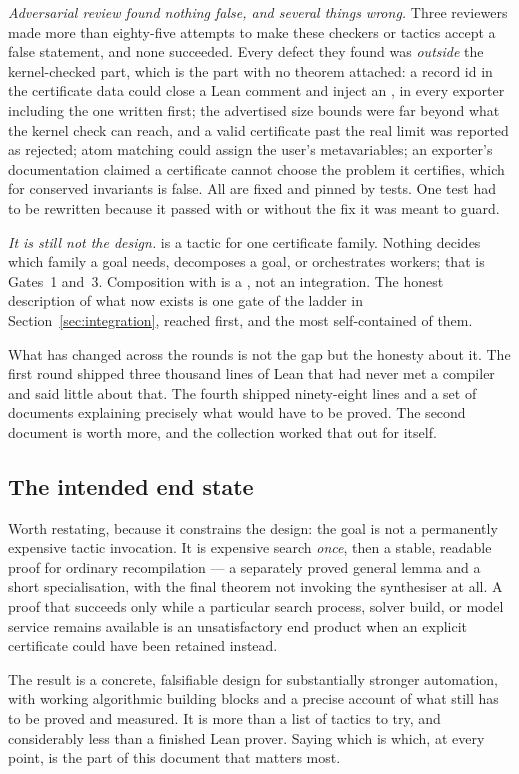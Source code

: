 \emph{Adversarial review found nothing false, and several things wrong.} Three
reviewers made more than eighty-five attempts to make these checkers or tactics
accept a false statement, and none succeeded. Every defect they found was
\emph{outside} the kernel-checked part, which is the part with no theorem
attached: a record id in the certificate data could close a Lean comment and
inject an , in every exporter including the one written first; the
advertised size bounds were far beyond what the kernel check can reach, and a
valid certificate past the real limit was reported as rejected; atom matching
could assign the user's metavariables; an exporter's documentation claimed a
certificate cannot choose the problem it certifies, which for conserved
invariants is false. All are fixed and pinned by tests. One test had to be
rewritten because it passed with or without the fix it was meant to guard.

\emph{It is still not the design.}  is a tactic for one
certificate family. Nothing decides which family a goal needs, decomposes a goal,
or orchestrates workers; that is Gates~1 and~3. Composition with  is
a , not an integration. The honest description of what now exists is
one gate of the ladder in Section~\ref{sec:integration}, reached first, and the
most self-contained of them.

What has changed across the rounds is not the gap but the honesty about it. The
first round shipped three thousand lines of Lean that had never met a compiler
and said little about that. The fourth shipped ninety-eight lines and a set of
documents explaining precisely what would have to be proved. The second
document is worth more, and the collection worked that out for itself.

\subsection{The intended end state}

Worth restating, because it constrains the design: the goal is not a permanently
expensive tactic invocation. It is expensive search \emph{once}, then a stable,
readable proof for ordinary recompilation --- a separately proved general lemma
and a short specialisation, with the final theorem not invoking the synthesiser
at all. A proof that succeeds only while a particular search process, solver
build, or model service remains available is an unsatisfactory end product when
an explicit certificate could have been retained instead.

The result is a concrete, falsifiable design for substantially stronger
automation, with working algorithmic building blocks and a precise account of
what still has to be proved and measured. It is more than a list of tactics to
try, and considerably less than a finished Lean prover. Saying which is which,
at every point, is the part of this document that matters most.
